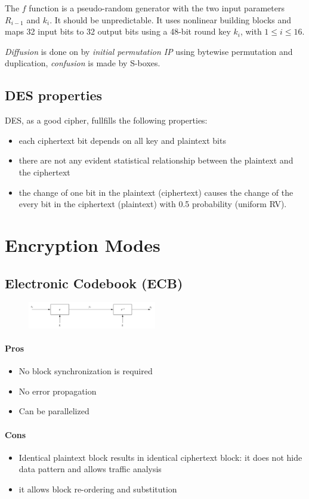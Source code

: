 \documentclass[a4paper,12pt]{article}
\begin{document}
The $f$ function is a pseudo-random generator with the two input parameters $R_{i-1}$ and $k_i$. It should be unpredictable. It uses nonlinear building blocks and maps 32 input bits to 32 output bits using a 48-bit round key $k_i$, with $1 \leq i \leq 16$.

\textit{Diffusion} is done on by \textit{initial permutation IP} using bytewise permutation and duplication, \textit{confusion} is made by S-boxes.

\subsection{DES properties}
DES, as a good cipher, fullfills the following properties:
\begin{itemize}
	\item each ciphertext bit depends on all key and plaintext bits
	\item there are not any evident statistical relationship between the plaintext and the ciphertext
	\item the change of one bit in the plaintext (ciphertext) causes the change of the every bit in the ciphertext (plaintext) with 0.5 probability (uniform RV).
\end{itemize} 

\section{Encryption Modes}
\subsection{Electronic Codebook (ECB)}
\begin{figure}[H]
  \centering
  \includegraphics[width=0.5\textwidth]{img/ecb}
\end{figure}
\paragraph{Pros}
\begin{itemize}
	\item No block synchronization is required
	\item No error propagation
	\item Can be parallelized
\end{itemize}
\paragraph{Cons}
\begin{itemize}
	\item Identical plaintext block results in identical ciphertext block: it does not hide data pattern and allows traffic analysis
	\item it allows block re-ordering and substitution
\end{itemize}
\end{document}
